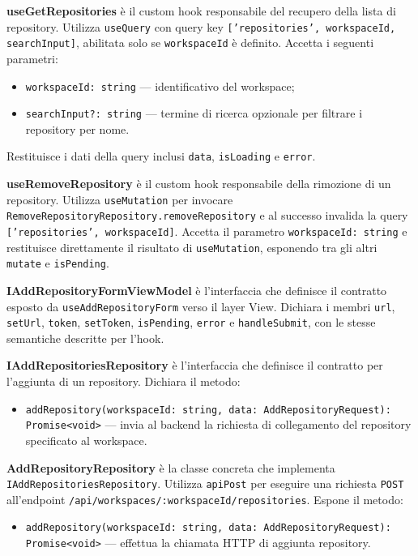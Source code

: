 \documentclass[a4paper, 11pt]{article}
\newcounter{subsubsubsection}[subsubsection]
\newcounter{subsubsubsubsection}[subsubsubsection]
\begin{document}
\textbf{useGetRepositories} è il custom hook responsabile del recupero della lista di repository.
Utilizza \texttt{useQuery} con query key \texttt{['repositories', workspaceId, searchInput]},
abilitata solo se \texttt{workspaceId} è definito. Accetta i seguenti parametri:
\begin{itemize}
  \item \texttt{workspaceId: string} — identificativo del workspace;
  \item \texttt{searchInput?: string} — termine di ricerca opzionale per filtrare i repository
        per nome.
\end{itemize}
Restituisce i dati della query inclusi \texttt{data}, \texttt{isLoading} e \texttt{error}.


\textbf{useRemoveRepository} è il custom hook responsabile della rimozione di un repository.
Utilizza \texttt{useMutation} per invocare \texttt{RemoveRepositoryRepository.removeRepository}
e al successo invalida la query \texttt{['repositories', workspaceId]}. Accetta il parametro
\texttt{workspaceId: string} e restituisce direttamente il risultato di \texttt{useMutation},
esponendo tra gli altri \texttt{mutate} e \texttt{isPending}.


\textbf{IAddRepositoryFormViewModel} è l'interfaccia che definisce il contratto esposto da
\texttt{useAddRepositoryForm} verso il layer View. Dichiara i membri \texttt{url}, \texttt{setUrl},
\texttt{token}, \texttt{setToken}, \texttt{isPending}, \texttt{error} e \texttt{handleSubmit},
con le stesse semantiche descritte per l'hook.


\textbf{IAddRepositoriesRepository} è l'interfaccia che definisce il contratto per l'aggiunta
di un repository. Dichiara il metodo:
\begin{itemize}
  \item \texttt{addRepository(workspaceId: string, data: AddRepositoryRequest): Promise<void>}
        — invia al backend la richiesta di collegamento del repository specificato al workspace.
\end{itemize}

\textbf{AddRepositoryRepository} è la classe concreta che implementa
\texttt{IAddRepositoriesRepository}. Utilizza \texttt{apiPost} per eseguire una richiesta
\texttt{POST} all'endpoint \texttt{/api/workspaces/:workspaceId/repositories}. Espone il metodo:
\begin{itemize}
  \item \texttt{addRepository(workspaceId: string, data: AddRepositoryRequest): Promise<void>}
        — effettua la chiamata HTTP di aggiunta repository.
\end{itemize}
\end{document}
